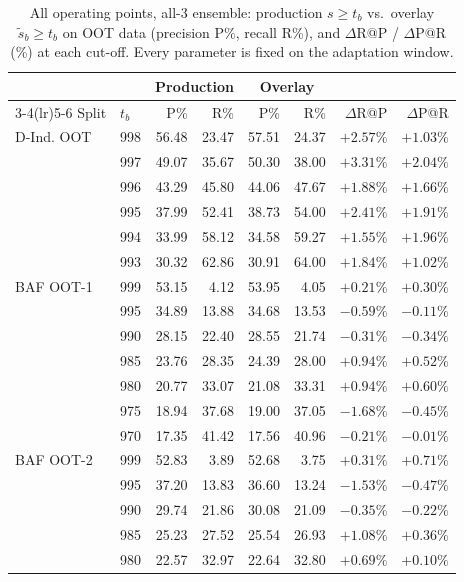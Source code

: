 \documentclass[11pt]{article}
\begin{document}
\begin{table}[t]
\centering
\scriptsize
\setlength{\tabcolsep}{4pt}
\caption{All operating points, all-3 ensemble: production $s\ge t_b$ vs.\ overlay
  $\tilde s_b\ge t_b$ on OOT data (precision P\%, recall R\%), and $\Delta$R@P / $\Delta$P@R
  (\%) at each cut-off. Every parameter is fixed on the adaptation window.}
\label{tab:perband_all}
\begin{tabular}{llrrrrrr}
\toprule
& & \multicolumn{2}{c}{Production} & \multicolumn{2}{c}{Overlay} & & \\
\cmidrule(lr){3-4}\cmidrule(lr){5-6}
Split & $t_b$ & P\% & R\% & P\% & R\% & $\Delta$R@P & $\Delta$P@R \\
\midrule
D-Ind. OOT & 998 & 56.48 & 23.47 & 57.51 & 24.37 & $+2.57\%$ & $+1.03\%$ \\
 & 997 & 49.07 & 35.67 & 50.30 & 38.00 & $+3.31\%$ & $+2.04\%$ \\
 & 996 & 43.29 & 45.80 & 44.06 & 47.67 & $+1.88\%$ & $+1.66\%$ \\
 & 995 & 37.99 & 52.41 & 38.73 & 54.00 & $+2.41\%$ & $+1.91\%$ \\
 & 994 & 33.99 & 58.12 & 34.58 & 59.27 & $+1.55\%$ & $+1.96\%$ \\
 & 993 & 30.32 & 62.86 & 30.91 & 64.00 & $+1.84\%$ & $+1.02\%$ \\
\midrule
BAF OOT-1 & 999 & 53.15 & 4.12 & 53.95 & 4.05 & $+0.21\%$ & $+0.30\%$ \\
 & 995 & 34.89 & 13.88 & 34.68 & 13.53 & $-0.59\%$ & $-0.11\%$ \\
 & 990 & 28.15 & 22.40 & 28.55 & 21.74 & $-0.31\%$ & $-0.34\%$ \\
 & 985 & 23.76 & 28.35 & 24.39 & 28.00 & $+0.94\%$ & $+0.52\%$ \\
 & 980 & 20.77 & 33.07 & 21.08 & 33.31 & $+0.94\%$ & $+0.60\%$ \\
 & 975 & 18.94 & 37.68 & 19.00 & 37.05 & $-1.68\%$ & $-0.45\%$ \\
 & 970 & 17.35 & 41.42 & 17.56 & 40.96 & $-0.21\%$ & $-0.01\%$ \\
\midrule
BAF OOT-2 & 999 & 52.83 & 3.89 & 52.68 & 3.75 & $+0.31\%$ & $+0.71\%$ \\
 & 995 & 37.20 & 13.83 & 36.60 & 13.24 & $-1.53\%$ & $-0.47\%$ \\
 & 990 & 29.74 & 21.86 & 30.08 & 21.09 & $-0.35\%$ & $-0.22\%$ \\
 & 985 & 25.23 & 27.52 & 25.54 & 26.93 & $+1.08\%$ & $+0.36\%$ \\
 & 980 & 22.57 & 32.97 & 22.64 & 32.80 & $+0.69\%$ & $+0.10\%$ \\

\end{tabular}
\end{table}
\end{document}

